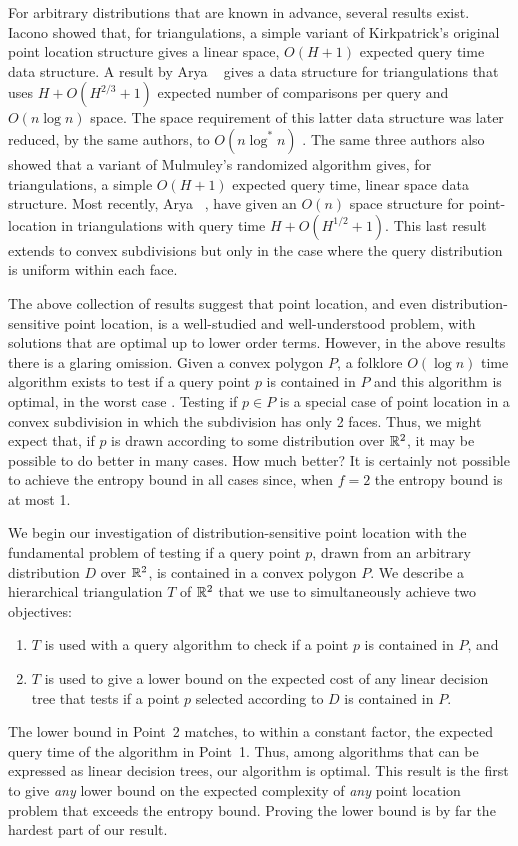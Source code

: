 \documentclass[charterfonts,lotsofwhite]{patmorin}
\begin{document}
For arbitrary distributions that are known in advance, several results
exist.  Iacono \cite{i01,i04} showed that, for triangulations, a
simple variant of Kirkpatrick's original point location structure
gives a linear space, $O(H+1)$ expected query time data structure.  A
result by Arya \etal\ \cite{amm00} gives a data structure for
triangulations that uses $H + O(H^{2/3}+1)$ expected number of
comparisons per query and $O(n\log n)$ space.  The space requirement
of this latter data structure was later reduced, by the same authors,
to $O(n\log^* n)$ \cite{amm01a}.  The same three authors
\cite{amm01b} also showed that a variant of Mulmuley's randomized algorithm
gives, for triangulations, a simple $O(H+1)$ expected query time,
linear space data structure.  Most recently, Arya \etal\
\cite{ammw07}, have given an $O(n)$ space structure for point-location
in triangulations with query time $H+O(H^{1/2}+1)$.  This last result
extends to convex subdivisions but only in the case where the query
distribution is uniform within each face.

The above collection of results suggest that point location, and even
distribution-sensitive point location, is a well-studied and
well-understood problem, with solutions that are optimal up to
lower order terms.  However, in the above results there is a glaring
omission.  Given a convex polygon $P$, a folklore $O(\log n)$ time
algorithm exists to test if a query point $p$ is contained in $P$ and
this algorithm is optimal, in the worst case \cite{ps85}.  Testing if
$p\in P$ is a special case of point location in a convex subdivision
in which the subdivision has only 2 faces.  Thus, we might expect that, if
$p$ is drawn according to some distribution over $\mathbb{R}^2$, it may be
possible to do better in many cases. How much better?  It is certainly
not possible to achieve the entropy bound in all cases since, when
$f=2$ the entropy bound is at most 1.

We begin our investigation of distribution-sensitive point location
with the fundamental problem of testing if a query point $p$, drawn
from an arbitrary distribution $D$ over $\mathbb{R}^2$, is contained in a
convex polygon $P$.  We describe a hierarchical triangulation $T$ of
$\mathbb{R}^2$ that we use to simultaneously achieve two objectives:
\begin{enumerate}
\item $T$ is used with a query algorithm to check if a point $p$ 
	is contained in $P$, and
\item $T$ is used to give a lower bound on the expected cost of
	any linear decision tree that tests if a point $p$ selected
	according to $D$ is contained in $P$.
\end{enumerate}
The lower bound in Point~2 matches, to within a constant factor, the
expected query time of the algorithm in Point~1.  Thus, among
algorithms that can be expressed as linear decision trees, our
algorithm is optimal. This result is the first to give
\emph{any} lower bound on the expected complexity of \emph{any} point
location problem that exceeds the entropy bound. Proving the lower
bound is by far the hardest part of our result.  
\end{document}

